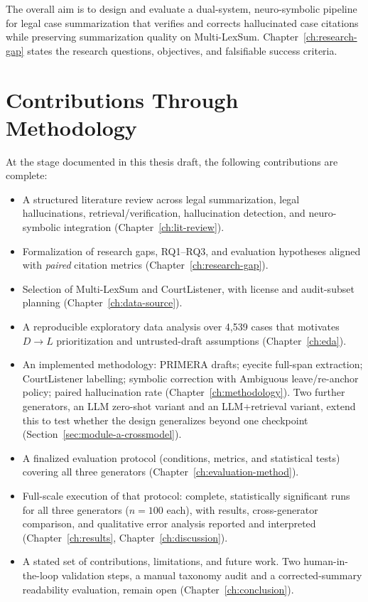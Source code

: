 The overall aim is to design and evaluate a dual-system, neuro-symbolic pipeline for legal case summarization that verifies and corrects hallucinated case citations while preserving summarization quality on Multi-LexSum. Chapter~\ref{ch:research-gap} states the research questions, objectives, and falsifiable success criteria.

\section{Contributions Through Methodology}
\label{sec:intro-contrib}

At the stage documented in this thesis draft, the following contributions are complete:
\begin{itemize}
  \item A structured literature review across legal summarization, legal hallucinations, retrieval/verification, hallucination detection, and neuro-symbolic integration (Chapter~\ref{ch:lit-review}).
  \item Formalization of research gaps, RQ1--RQ3, and evaluation hypotheses aligned with \emph{paired} citation metrics (Chapter~\ref{ch:research-gap}).
  \item Selection of Multi-LexSum and CourtListener, with license and audit-subset planning (Chapter~\ref{ch:data-source}).
  \item A reproducible exploratory data analysis over 4{,}539 cases that motivates $D\rightarrow L$ prioritization and untrusted-draft assumptions (Chapter~\ref{ch:eda}).
  \item An implemented methodology: PRIMERA drafts; eyecite full-span extraction; CourtListener labelling; symbolic correction with Ambiguous leave/re-anchor policy; paired hallucination rate (Chapter~\ref{ch:methodology}). Two further generators, an LLM zero-shot variant and an LLM+retrieval variant, extend this to test whether the design generalizes beyond one checkpoint (Section~\ref{sec:module-a-crossmodel}).
  \item A finalized evaluation protocol (conditions, metrics, and statistical tests) covering all three generators (Chapter~\ref{ch:evaluation-method}).
  \item Full-scale execution of that protocol: complete, statistically significant runs for all three generators ($n=100$ each), with results, cross-generator comparison, and qualitative error analysis reported and interpreted (Chapter~\ref{ch:results}, Chapter~\ref{ch:discussion}).
  \item A stated set of contributions, limitations, and future work. Two human-in-the-loop validation steps, a manual taxonomy audit and a corrected-summary readability evaluation, remain open (Chapter~\ref{ch:conclusion}).
\end{itemize}

